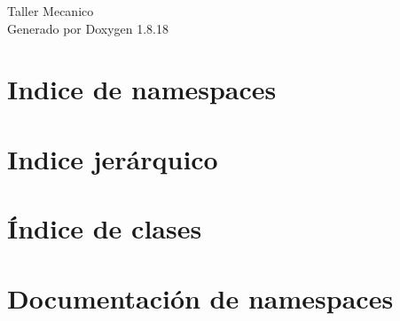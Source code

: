 \let\mypdfximage\pdfximage\def\pdfximage{\immediate\mypdfximage}\documentclass[twoside]{book}
\newcommand{\+}{\discretionary{\mbox{\scriptsize$\hookleftarrow$}}{}{}}
\newcommand{\clearemptydoublepage}{%
  \newpage{\pagestyle{empty}\cleardoublepage}%
}
\begin{document}
\hypersetup{pageanchor=false,
             bookmarksnumbered=true,
             pdfencoding=unicode
            }
\begin{titlepage}
\vspace*{7cm}
\begin{center}%
{\Large Taller Mecanico }\\
\vspace*{1cm}
{\large Generado por Doxygen 1.8.18}\\
\end{center}
\end{titlepage}
\clearemptydoublepage
{}
\tableofcontents
\clearemptydoublepage
{}
\hypersetup{pageanchor=true}

\chapter{Indice de namespaces}

\chapter{Indice jerárquico}

\chapter{Índice de clases}

\chapter{Documentación de namespaces}























\end{document}
